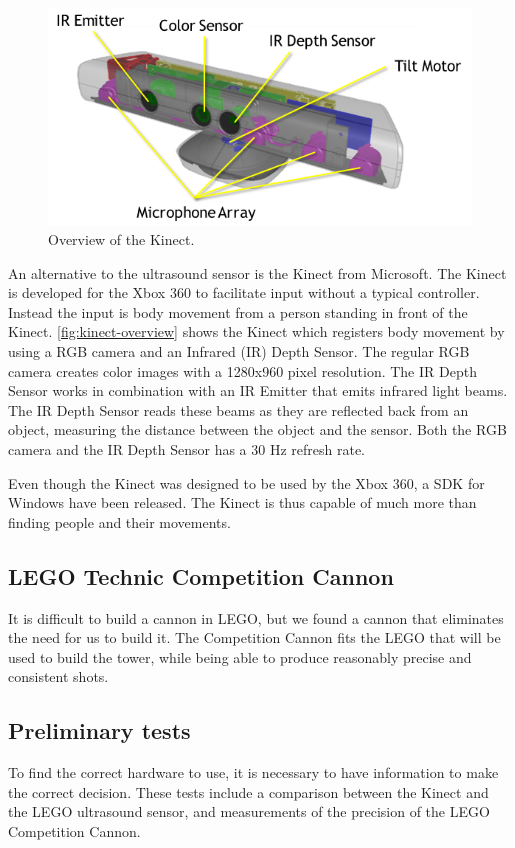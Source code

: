 \begin{figure}[hbtp]
\centering
\includegraphics[width=.7\textwidth]{img/kinect-overview.png}
\caption{Overview of the Kinect\cite{kinectspec}.} 
\label{fig:kinect-overview} 
\end{figure}

An alternative to the ultrasound sensor is the Kinect from Microsoft. The Kinect is developed for the Xbox 360 to facilitate input without a typical controller. Instead the input is body movement from a person standing in front of the Kinect. \autoref{fig:kinect-overview} shows the Kinect which registers body movement by using a RGB camera and an Infrared (IR) Depth Sensor\cite{kinectspec}. The regular RGB camera creates color images with a 1280x960 pixel resolution. The IR Depth Sensor works in combination with an IR Emitter that emits infrared light beams. The IR Depth Sensor reads these beams as they are reflected back from an object, measuring the distance between the object and the sensor. Both the RGB camera and the IR Depth Sensor has a 30 Hz refresh rate.

Even though the Kinect was designed to be used by the Xbox 360, a SDK for Windows have been released. The Kinect is thus capable of much more than finding people and their movements.

\subsection{LEGO Technic Competition Cannon}
It is difficult to build a cannon in LEGO, but we found a cannon that eliminates the need for us to build it. The Competition Cannon fits the LEGO that will be used to build the tower, while being able to produce reasonably precise and consistent shots.

\subsection{Preliminary tests}
To find the correct hardware to use, it is necessary to have information to make the correct decision. These tests include a comparison between the Kinect and the LEGO ultrasound sensor, and measurements of the precision of the LEGO Competition Cannon.

